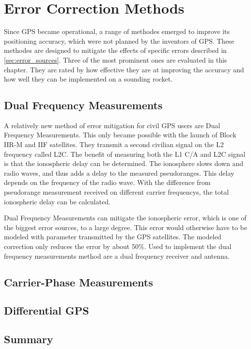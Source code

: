 \chapter{Error Correction Methods}

Since GPS became operational, a range of methodes emerged to improve its positioning accuracy, which were not planned by the inventors of GPS.
These methodes are designed to mitigate the effects of specific errors described in \ref{sec:error_sources}.
Three of the most prominent ones are evaluated in this chapter.
They are rated by how effective they are at improving the accuracy and how well they can be implemented on a sounding rocket.


\section{Dual Frequency Measurements}

A relatively new method of error mitigation for civil GPS users are Dual Frequency Measurements.
This only became possible with the launch of Block IIR-M and IIF satellites.
They transmit a second civilian signal on the L2 frequency called L2C.
The benefit of measuring both the L1 C/A and L2C signal is that the ionospheric delay can be determined.
The ionosphere slows down and radio waves, and thus adds a delay to the measured pseudoranges.
This delay depends on the frequency of the radio wave.
With the difference from pseudorange measurement received on different carrier frequencys, the total ionospheric delay can be calculated.

Dual Frequency Measurements can mitigate the ionospheric error, which is one of the biggest error sources, to a large degree.
This error would otherwise have to be modeled with parameter transmitted by the GPS satellites.
The modeled correction only reduces the error by about 50\%.
Used to implement the dual frequency measurements method are a dual frequency receiver and antenna.
\cite{L1_L2}

\section{Carrier-Phase Measurements}

\section{Differential GPS}

\section{Summary}